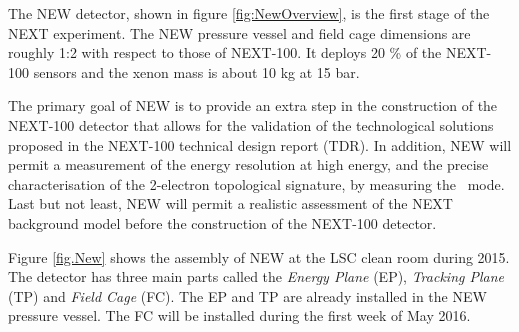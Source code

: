 The NEW detector, shown in figure \ref{fig:NewOverview}, is the first stage of the NEXT experiment. The NEW pressure vessel and field cage
 dimensions are roughly 1:2 with respect to those of NEXT-100. It deploys 20 \% of the NEXT-100 sensors and the xenon mass is about 10 kg at 15 bar. 

The primary goal of NEW is to provide an extra step in the construction of the NEXT-100 detector that allows for the validation of the technological solutions proposed in the NEXT-100 technical design report (TDR)\cite{Alvarez:2012haa}. In addition, NEW will permit a measurement of the energy resolution at high energy, and the precise characterisation of the 2-electron topological signature, by measuring the \bbtnu\ mode. Last but not least, NEW will permit a realistic assessment of the NEXT background model before the construction of the NEXT-100 detector. 

Figure \ref{fig.New} shows the assembly of NEW at the LSC clean room during 2015. The detector has three main parts called the {\em Energy Plane} (EP), {\em Tracking Plane} (TP) and {\em Field Cage} (FC). The EP and TP are already installed in the NEW pressure vessel. The FC will be installed during the first week of May 2016.

%
%
%
%
%

